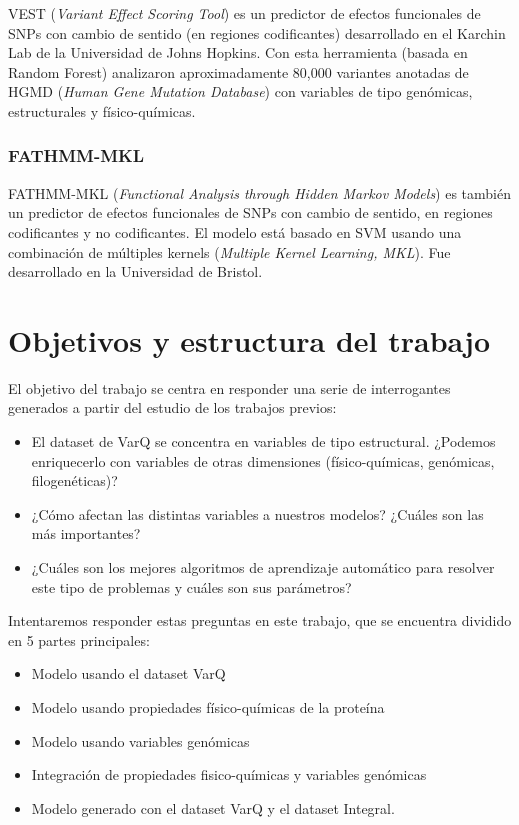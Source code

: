 VEST (\textit{Variant Effect Scoring Tool}) es un predictor de efectos funcionales de SNPs con cambio de sentido (en regiones codificantes) desarrollado en el Karchin Lab de la Universidad de Johns Hopkins. Con esta herramienta (basada en Random Forest) analizaron aproximadamente 80,000 variantes anotadas de HGMD (\textit{Human Gene Mutation Database}) con variables de tipo genómicas, estructurales y físico-químicas.

\subsubsection{FATHMM-MKL \cite{Shihab2015}}

FATHMM-MKL (\textit{Functional Analysis through Hidden Markov Models}) es también un predictor de efectos funcionales de SNPs con cambio de sentido, en regiones codificantes y no codificantes. El modelo está basado en SVM usando una combinación de múltiples kernels (\textit{Multiple Kernel Learning, MKL}). Fue desarrollado en la Universidad de Bristol. 



\section{Objetivos y estructura del trabajo}

El objetivo del trabajo se centra en responder una serie de interrogantes generados a partir del estudio de los trabajos previos:

\begin{itemize}
    \item El dataset de VarQ se concentra en variables de tipo estructural. ¿Podemos enriquecerlo con variables de otras dimensiones (físico-químicas, genómicas, filogenéticas)?
    \item ¿Cómo afectan las distintas variables a nuestros modelos? ¿Cuáles son las más importantes?
    \item ¿Cuáles son los mejores algoritmos de aprendizaje automático para resolver este tipo de problemas y cuáles son sus parámetros?
    
\end{itemize}

Intentaremos responder estas preguntas en este trabajo, que se encuentra dividido en 5 partes principales:

\begin{itemize}
    \item Modelo usando el dataset VarQ
    \item Modelo usando propiedades físico-químicas de la proteína
    \item Modelo usando variables genómicas
    \item Integración de propiedades fisico-químicas y variables genómicas
    \item Modelo generado con el dataset VarQ y el dataset Integral.
\end{itemize}


